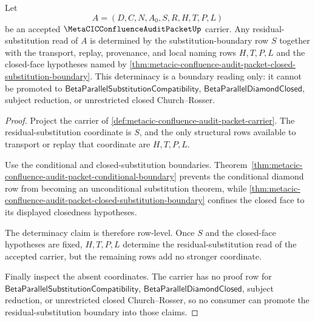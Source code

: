 \begin{theorem}
\label{thm:metacic-confluence-audit-residual-substitution-determinacy}
Let
$$
A=(D,C,N,A_0,S,R,H,T,P,L)
$$
be an accepted $\MetaCICConfluenceAuditPacketUp$ carrier. Any residual-substitution read of $A$ is determined by the substitution-boundary row $S$ together with the transport, replay, provenance, and local naming rows $H,T,P,L$ and the closed-face hypotheses named by \autoref{thm:metacic-confluence-audit-packet-closed-substitution-boundary}. This determinacy is a boundary reading only: it cannot be promoted to $\mathsf{BetaParallelSubstitutionCompatibility}$, $\mathsf{BetaParallelDiamondClosed}$, subject reduction, or unrestricted closed Church--Rosser.
\end{theorem}
\begin{proof}
Project the carrier of \autoref{def:metacic-confluence-audit-packet-carrier}. The residual-substitution coordinate is $S$, and the only structural rows available to transport or replay that coordinate are $H,T,P,L$.

Use the conditional and closed-substitution boundaries. Theorem~\ref{thm:metacic-confluence-audit-packet-conditional-boundary} prevents the conditional diamond row from becoming an unconditional substitution theorem, while \autoref{thm:metacic-confluence-audit-packet-closed-substitution-boundary} confines the closed face to its displayed closedness hypotheses.

The determinacy claim is therefore row-level. Once $S$ and the closed-face hypotheses are fixed, $H,T,P,L$ determine the residual-substitution read of the accepted carrier, but the remaining rows add no stronger coordinate.

Finally inspect the absent coordinates. The carrier has no proof row for $\mathsf{BetaParallelSubstitutionCompatibility}$, $\mathsf{BetaParallelDiamondClosed}$, subject reduction, or unrestricted closed Church--Rosser, so no consumer can promote the residual-substitution boundary into those claims.
\end{proof}

